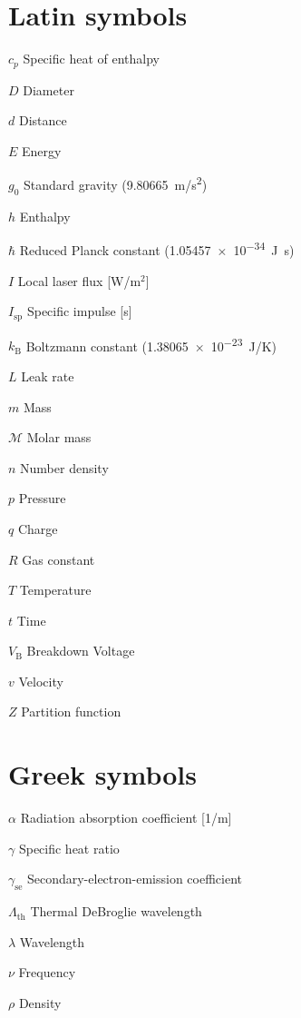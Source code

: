 \begin{multicols*}{2}
    \section*{Latin symbols}
    \begin{nomlist}
        \item[$c_p$]            Specific heat of enthalpy
        \item[$D$]              Diameter
        \item[$d$]              Distance
        \item[$E$]              Energy
        \item[$g_0$]            Standard gravity (9.80665~\unit{m/s^2}) 
        \item[$h$]              Enthalpy
        \item[$\hbar$]          Reduced Planck constant (\qty{1.05457e-34}{J.s})
        \item[$I$]              Local laser flux [W/m$^2$]
        \item[$I_\text{sp}$]    Specific impulse [s]
        \item[$k_\mathrm{B}$]   Boltzmann constant (\qty{1.38065e-23}{J/K})
        \item[$L$]              Leak rate
        \item[$m$]              Mass
        \item[$\mathcal{M}$]    Molar mass
        \item[$n$]              Number density 
        \item[$p$]              Pressure
        \item[$q$]              Charge
        \item[$R$]              Gas constant
        \item[$T$]              Temperature
        \item[$t$]              Time
        \item[$V_\mathrm{B}$]   Breakdown Voltage
        \item[$v$]              Velocity
        \item[$Z$]              Partition function
    \end{nomlist}

    \section*{Greek symbols}
    \begin{nomlist}
        \item[$\alpha$]         Radiation absorption coefficient [1/m]
        \item[$\gamma$]         Specific heat ratio
        \item[$\gamma_\mathrm{se}$]         Secondary-electron-emission coefficient
        \item[$\Lambda_\mathrm{th}$]        Thermal DeBroglie wavelength
        \item[$\lambda$]        Wavelength
        \item[$\nu$]            Frequency
        \item[$\rho$]           Density
    \end{nomlist}


\end{multicols*}
